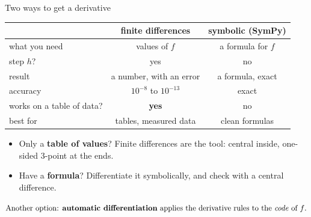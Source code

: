 \documentclass[aspectratio=169]{beamer}
\newcommand{\cbox}[2]{\colorbox{#1}{\ensuremath{\displaystyle #2}}}
\begin{document}
\begin{frame}{Two ways to get a derivative}
\centering
\small
\setlength{\tabcolsep}{14pt}\renewcommand{\arraystretch}{1.4}
\begin{tabular}{@{}lcc@{}}
\toprule
 & \textbf{finite differences} & \textbf{symbolic} (SymPy) \\ \midrule
what you need & values of $f$ & a formula for $f$ \\
step $h$? & yes & no \\
result & a number, with an error & a formula, exact \\
accuracy & $10^{-8}$ to $10^{-13}$ & exact \\
works on a table of data? & \textbf{yes} & no \\
best for & tables, measured data & clean formulas \\
\bottomrule
\end{tabular}

\vspace{0.8em}
\footnotesize
\begin{minipage}{0.85\textwidth}
\begin{itemize}
\item Only a \textbf{table of values}? Finite differences are the tool: central inside, one-sided 3-point at the ends.
\item Have a \textbf{formula}? Differentiate it symbolically, and check with a central difference.
\end{itemize}
\end{minipage}

\vspace{0.6em}
\cbox{gray!10}{\text{Another option: \textbf{automatic differentiation} applies the derivative rules to the \emph{code} of } f\text{.}}
\end{frame}
\end{document}
